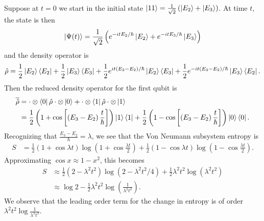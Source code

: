 Suppose at \(t=0\) we start in the initial state \(\left|11\right\rangle = \frac{1}{\sqrt{2}}\left(\left|E_2\right\rangle+\left|E_3\right\rangle\right)\). At time \(t\), the state is then
\[
\left|\Psi(t)\right\rangle = \frac{1}{\sqrt{2}}\left(e^{-itE_2/\hbar}\left|E_2\right\rangle + e^{-itE_3/\hbar} \left|E_3\right\rangle\right)
\]
and the density operator is
\[
\hat{\rho} = \frac{1}{2}\left|E_2\right\rangle\left\langle E_2\right| + \frac{1}{2}\left|E_3\right\rangle\left\langle E_3\right| + \frac{1}{2} e^{it\left(E_3-E_2\right)/\hbar} \left|E_2\right\rangle\left\langle E_3\right| + \frac{1}{2} e^{-it\left(E_3 - E_2\right)/\hbar} \left|E_3\right\rangle\left\langle E_2\right|.
\]
Then the reduced density operator for the first qubit is
\begin{align*}
\overline{\hat{\rho}} &= \cdot\otimes\left\langle0\right| \hat{\rho} \cdot\otimes\left|0\right\rangle + \cdot\otimes\left\langle1\right| \hat{\rho} \cdot\otimes\left|1\right\rangle \\
&= \frac{1}{2}\left(1 + \cos \left[\left(E_3-E_2\right)\frac{t}{\hbar}\right] \right)\left|1\right\rangle\left\langle1\right| + \frac{1}{2}\left(1 -\cos \left[\left(E_3-E_2\right)\frac{t}{\hbar}\right] \right)\left|0\right\rangle\left\langle0\right|.
\end{align*}
Recognizing that \(\frac{E_3-E_2}{\hbar} = \lambda\), we see that the Von Neumann subsystem entropy is
\begin{align*}
S &= \frac{1}{2}\left(1 + \cos \lambda t \right)\log \left(1+\cos \frac{\lambda t}{2}\right)
+ \frac{1}{2}\left(1 - \cos \lambda t \right)\log \left(1-\cos \frac{\lambda t}{2}\right).
\end{align*}
Approximating \(\cos x \approx 1-x^2\), this becomes
\begin{align*}
S &\approx \frac{1}{2}\left(2-\lambda^2 t^2\right) \log \left(2-\lambda^2 t^2/4\right) + \frac{1}{2}\lambda^2 t^2 \log \left(\lambda^2 t^2\right) \\
&\approx \log 2 - \frac{1}{2}\lambda^2 t^2 \log \left(\frac{1}{\lambda^2 t^2}\right).
\end{align*}
We observe that the leading order term for the change in entropy is of order \(\lambda^2t^2 \log \frac{1}{\lambda^2 t^2}\).

